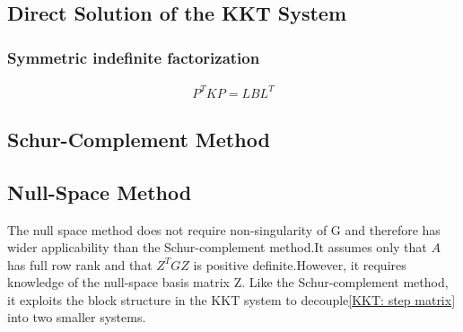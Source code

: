 \documentclass[11pt]{article}
\begin{document}
    \subsection{Direct Solution of the KKT System} \label{subsec:-direct-solution-KKT}

    \subsubsection{Symmetric indefinite factorization} \label{subsubsec:-symmetric-indefinite-factorization}
    \begin{align}
        P^TKP = LBL^T \tag{16.12} \label{eqn: symmetric-indefinite-factorization}
    \end{align}

    \subsection{Schur-Complement Method} \label{subsec:-schur-complement-method}

    \subsection{Null-Space Method} \label{subsec:-null-space-method}
    The null space method does not require non-singularity of G and therefore has wider applicability than the
    Schur-complement method.It assumes only that $A$ has full row rank and that $Z^TGZ$ is positive definite.However,
    it requires knowledge of the null-space basis matrix Z. Like the Schur-complement method, it exploits the block
    structure in the KKT system to decouple\eqref{KKT: step matrix} into two smaller systems.
\end{document}
